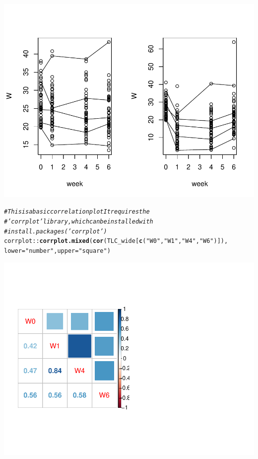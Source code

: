\documentclass[oneside]{book}\usepackage[]{graphicx}\usepackage[svgnames]{xcolor}
\makeatletter
\def\maxwidth{ %
  \ifdim\Gin@nat@width>\linewidth
    \linewidth
  \else
    \Gin@nat@width
  \fi
}
\newcommand{\hlstr}[1]{\textcolor[rgb]{0.192,0.494,0.8}{#1}}%
\newcommand{\hlcom}[1]{\textcolor[rgb]{0.678,0.584,0.686}{\textit{#1}}}%
\newcommand{\hlopt}[1]{\textcolor[rgb]{0,0,0}{#1}}%
\newcommand{\hlstd}[1]{\textcolor[rgb]{0.345,0.345,0.345}{#1}}%
\newcommand{\hlkwc}[1]{\textcolor[rgb]{0.333,0.667,0.333}{#1}}%
\newcommand{\hlkwd}[1]{\textcolor[rgb]{0.737,0.353,0.396}{\textbf{#1}}}%
\newenvironment{kframe}{%
 \def\at@end@of@kframe{}%
 \ifinner\ifhmode%
  \def\at@end@of@kframe{\end{minipage}}%
  \begin{minipage}{\columnwidth}%
 \fi\fi%
 \def\FrameCommand##1{\hskip\@totalleftmargin \hskip-\fboxsep
 \colorbox{shadecolor}{##1}\hskip-\fboxsep
     \hskip-\linewidth \hskip-\@totalleftmargin \hskip\columnwidth}%
 \MakeFramed {\advance\hsize-\width
   \@totalleftmargin\z@ \linewidth\hsize
   \@setminipage}}%
 {\par\unskip\endMakeFramed%
 \at@end@of@kframe}
\newenvironment{knitrout}{}{} %
\makeatother
\begin{document}
\begin{knitrout}
{\centering \includegraphics[width=\maxwidth]{figure/unnamed-chunk-3-4} 

}


\begin{kframe}\begin{alltt}
\hlcom{# This is a basic correlation plot It requires the}
\hlcom{# 'corrplot' library, which can be installed with}
\hlcom{# install.packages('corrplot')}
\hlstd{corrplot}\hlopt{::}\hlkwd{corrplot.mixed}\hlstd{(}\hlkwd{cor}\hlstd{(TLC_wide[}\hlkwd{c}\hlstd{(}\hlstr{"W0"}\hlstd{,} \hlstr{"W1"}\hlstd{,} \hlstr{"W4"}\hlstd{,} \hlstr{"W6"}\hlstd{)]),}
  \hlkwc{lower} \hlstd{=} \hlstr{"number"}\hlstd{,} \hlkwc{upper} \hlstd{=} \hlstr{"square"}\hlstd{)}
\end{alltt}
\end{kframe}

{\centering \includegraphics[width=\maxwidth]{figure/unnamed-chunk-3-5} 

}


\end{knitrout}
\end{document}
